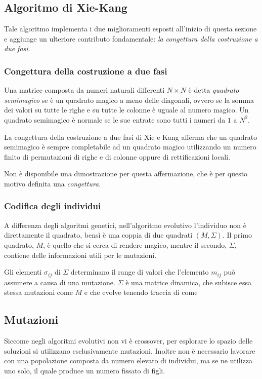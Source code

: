 \documentclass[italian,twoside,twocolumn]{article}
\begin{document}
\subsection{Algoritmo di Xie-Kang}

Tale algoritmo implementa i due miglioramenti esposti all'inizio di questa sezione e aggiunge un ulteriore contributo fondamentale: \emph{la congettura della costruzione a due fasi}.

\subsubsection{Congettura della costruzione a due fasi}
Una matrice composta da numeri naturali differenti $ N\times N $ è detta \emph{quadrato semimagico} se è un quadrato magico a meno delle diagonali, ovvero se la somma dei valori su tutte le righe e su tutte le colonne è uguale al numero magico. Un quadrato semimagico è normale se le sue entrate sono tutti i numeri da $ 1 $ a $ N^2 $. 

La congettura della costruzione a due fasi di Xie e Kang afferma che un quadrato semimagico è sempre completabile ad un quadrato magico utilizzando un numero finito di permutazioni di righe e di colonne oppure di rettificazioni locali. 

Non è disponibile una dimostrazione per questa affermazione, che è per questo motivo definita una \emph{congettura}.

\subsubsection{Codifica degli individui}
A differenza degli algoritmi genetici, nell'algoritmo evolutivo l'individuo non è direttamente il quadrato, bensì è una coppia di due quadrati $ \left(M, \Sigma \right) $. Il primo quadrato, $ M $, è quello che si cerca di rendere magico, mentre il secondo, $ \Sigma $, contiene delle informazioni utili per le mutazioni. 

Gli elementi $ \sigma_{ij} $ di $ \Sigma $ determinano il range di valori che l'elemento $ m_{ij} $ può assumere a causa di una mutazione. $ \Sigma $ è una matrice dinamica, che subisce essa stessa mutazioni come $ M $ e che evolve tenendo traccia di come 

\subsection{Mutazioni}
Siccome negli algoritmi evolutivi non vi è crossover, per esplorare lo spazio delle soluzioni si utilizzano esclusivamente mutazioni.
Inoltre non è necessario lavorare con una popolazione composta da numero elevato di individui, ma se ne utilizza uno solo, il quale produce un numero fissato di figli. 
\end{document}

